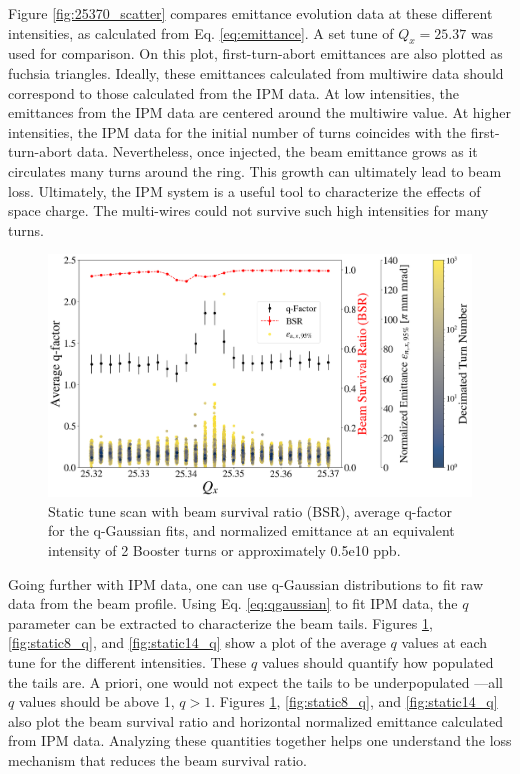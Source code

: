 Figure \ref{fig:25370_scatter} compares emittance evolution data at these different intensities, as calculated from Eq. \ref{eq:emittance}. A set tune of $Q_x=25.37$ was used for comparison. On this plot, first-turn-abort emittances are also plotted as fuchsia triangles. Ideally, these emittances calculated from multiwire data should correspond to those calculated from the IPM data. At low intensities, the emittances from the IPM data are centered around the multiwire value. At higher intensities, the IPM data for the initial number of turns coincides with the first-turn-abort data. Nevertheless, once injected, the beam emittance grows as it circulates many turns around the ring. This growth can ultimately lead to beam loss. Ultimately, the IPM system is a useful tool to characterize the effects of space charge. The multi-wires could not survive such high intensities for many turns. 

\begin{figure}[H]
    \centering
    \includegraphics[width=\columnwidth]{chapter6/static2turns_emittance_dampersOFF.png}
    \caption{Static tune scan with beam survival ratio (BSR), average q-factor for the q-Gaussian fits, and normalized emittance at an equivalent intensity of 2 Booster turns or approximately 0.5e10 ppb.}
    \label{fig:static2_q}
\end{figure}

Going further with IPM data, one can use q-Gaussian distributions to fit raw data from the beam profile. Using Eq. \ref{eq:qgaussian} to fit IPM data, the $q$ parameter can be extracted to characterize the beam tails. Figures \ref{fig:static2_q}, \ref{fig:static8_q}, and \ref{fig:static14_q} show a plot of the average $q$ values at each tune for the different intensities. These $q$ values should quantify how populated the tails are. A priori, one would not expect the tails to be underpopulated ---all $q$ values should be above 1, $q>1$. Figures \ref{fig:static2_q}, \ref{fig:static8_q}, and \ref{fig:static14_q} also plot the beam survival ratio and horizontal normalized emittance calculated from IPM data. Analyzing these quantities together helps one understand the loss mechanism that reduces the beam survival ratio. 


